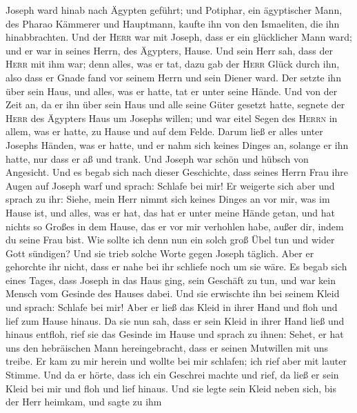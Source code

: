  Joseph ward hinab nach Ägypten geführt; und Potiphar, ein
ägyptischer Mann, des Pharao Kämmerer und Hauptmann, kaufte ihn von den
Ismaeliten, die ihn hinabbrachten.  Und der \textsc{Herr}
war mit Joseph, dass er ein glücklicher Mann ward; und er war in seines
Herrn, des Ägypters, Hause.  Und sein Herr sah, dass der
\textsc{Herr} mit ihm war; denn alles, was er tat, dazu gab der
\textsc{Herr} Glück durch ihn,  also dass er Gnade fand
vor seinem Herrn und sein Diener ward. Der setzte ihn über sein Haus,
und alles, was er hatte, tat er unter seine Hände.  Und
von der Zeit an, da er ihn über sein Haus und alle seine Güter gesetzt
hatte, segnete der \textsc{Herr} des Ägypters Haus um Josephs willen;
und war eitel Segen des \textsc{Herrn} in allem, was er hatte, zu Hause
und auf dem Felde.  Darum ließ er alles unter Josephs
Händen, was er hatte, und er nahm sich keines Dinges an, solange er ihn
hatte, nur dass er aß und trank. Und Joseph war schön und hübsch von
Angesicht.  Und es begab sich nach dieser Geschichte, dass
seines Herrn Frau ihre Augen auf Joseph warf und sprach: Schlafe bei
mir!  Er weigerte sich aber und sprach zu ihr: Siehe, mein
Herr nimmt sich keines Dinges an vor mir, was im Hause ist, und alles,
was er hat, das hat er unter meine Hände getan,  und hat
nichts so Großes in dem Hause, das er vor mir verhohlen habe, außer dir,
indem du seine Frau bist. Wie sollte ich denn nun ein solch groß Übel
tun und wider Gott sündigen?  Und sie trieb solche Worte
gegen Joseph täglich. Aber er gehorchte ihr nicht, dass er nahe bei ihr
schliefe noch um sie wäre.  Es begab sich eines Tages,
dass Joseph in das Haus ging, sein Geschäft zu tun, und war kein Mensch
vom Gesinde des Hauses dabei.  Und sie erwischte ihn bei
seinem Kleid und sprach: Schlafe bei mir! Aber er ließ das Kleid in
ihrer Hand und floh und lief zum Hause hinaus.  Da sie
nun sah, dass er sein Kleid in ihrer Hand ließ und hinaus entfloh,
 rief sie das Gesinde im Hause und sprach zu ihnen:
Sehet, er hat uns den hebräischen Mann hereingebracht, dass er seinen
Mutwillen mit uns treibe. Er kam zu mir herein und wollte bei mir
schlafen; ich rief aber mit lauter Stimme.  Und da er
hörte, dass ich ein Geschrei machte und rief, da ließ er sein Kleid bei
mir und floh und lief hinaus.  Und sie legte sein Kleid
neben sich, bis der Herr heimkam,  und sagte zu ihm
